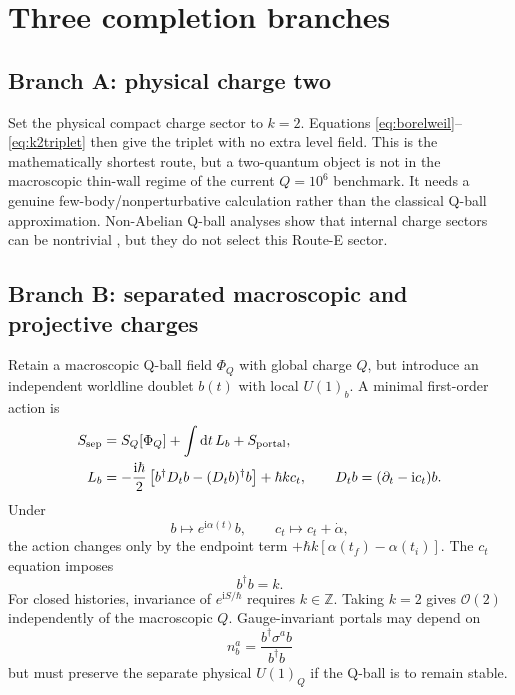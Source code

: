 \documentclass[11pt]{article}
\numberwithin{equation}{section}
\newcommand{\ZZ}{\mathbb Z}
\newcommand{\cO}{\mathcal O}
\newcommand{\dd}{\mathrm d}
\newcommand{\ii}{\mathrm i}
\begin{document}
\section{Three completion branches}

\subsection{Branch A: physical charge two}

Set the physical compact charge sector to \(k=2\).  Equations
\eqref{eq:borelweil}--\eqref{eq:k2triplet} then give the triplet with no extra
level field.  This is the mathematically shortest route, but a two-quantum
object is not in the macroscopic thin-wall regime of the current
\(Q=10^6\) benchmark.  It needs a genuine few-body/nonperturbative calculation
rather than the classical Q-ball approximation.  Non-Abelian Q-ball analyses
show that internal charge sectors can be nontrivial
\cite{SafianColemanAxenides1988}, but they do not select this Route-E sector.

\subsection{Branch B: separated macroscopic and projective charges}

Retain a macroscopic Q-ball field \(\Phi_Q\) with global charge \(Q\), but
introduce an independent worldline doublet \(b(t)\) with local
\(U(1)_b\).  A minimal first-order action is
\begin{align}
 S_{\rm sep}&=S_Q[\Phi_Q]+\int\dd t\,L_b+S_{\rm portal},
 \label{eq:separatedaction}\\
 L_b&=-\frac{\ii\hbar}{2}
 \left[b^\dagger D_tb-(D_tb)^\dagger b\right]+\hbar k c_t,
 \qquad D_tb=(\partial_t-\ii c_t)b.
 \label{eq:firstorderb}
\end{align}
Under
\begin{equation}
 b\mapsto e^{\ii\alpha(t)}b,
 \qquad c_t\mapsto c_t+\dot\alpha,
\end{equation}
the action changes only by the endpoint term
\(+\hbar k[\alpha(t_f)-\alpha(t_i)]\).  The \(c_t\) equation imposes
\begin{equation}
 b^\dagger b=k.
\end{equation}
For closed histories, invariance of \(e^{\ii S/\hbar}\) requires
\(k\in\ZZ\).  Taking \(k=2\) gives \(\cO(2)\) independently of the
macroscopic \(Q\).  Gauge-invariant portals may depend on
\begin{equation}
 n_b^a=\frac{b^\dagger\sigma^a b}{b^\dagger b}
\end{equation}
but must preserve the separate physical \(U(1)_Q\) if the Q-ball is to remain
stable.
\end{document}
